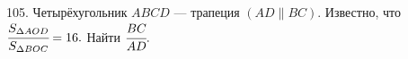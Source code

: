 105. Четырёхугольник $ABCD$ --- трапеция $(AD\parallel BC).$ Известно, что $\cfrac{S_{\Delta AOD}}{S_{\Delta BOC}}=16.$ Найти $\cfrac{BC}{AD}.$\\
